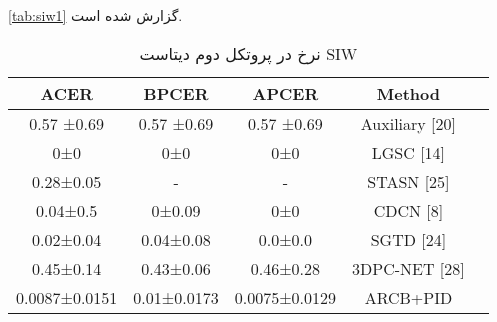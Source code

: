 \ref{tab:siw1}
گزارش شده است.
\begin{table}[ht]
	\caption{نرخ در پروتکل دوم دیتاست SIW}
	\label{tab:siw2}
	\centering
	\onehalfspacing
	\begin{tabular}{|c|c|c|c|c|}
		\hline ACER          & BPCER       & APCER         & Method                &  \\
		\hline 0.57 ±0.69    & 0.57 ±0.69  & 0.57 ±0.69    & Auxiliary {[}20{]}    &  \\
		\hline 0±0           & 0±0         & 0±0           & LGSC {[}14{]}         &  \\
		\hline 0.28±0.05     & -           & -             & STASN {[}25{]}        &  \\
		\hline 0.04±0.5      & 0±0.09      & 0±0           & CDCN {[}8{]}          &  \\
		\hline 0.02±0.04     & 0.04±0.08   & 0.0±0.0       & SGTD 				{[}24{]}     &  \\
		\hline 0.45±0.14     & 0.43±0.06   & 0.46±0.28     & 3DPC-NET 				{[}28{]} &  \\
		0.0087±0.0151 & 0.01±0.0173 & 0.0075±0.0129 & ARCB+PID              &  \\
		\hline         
	\end{tabular}
\end{table}


